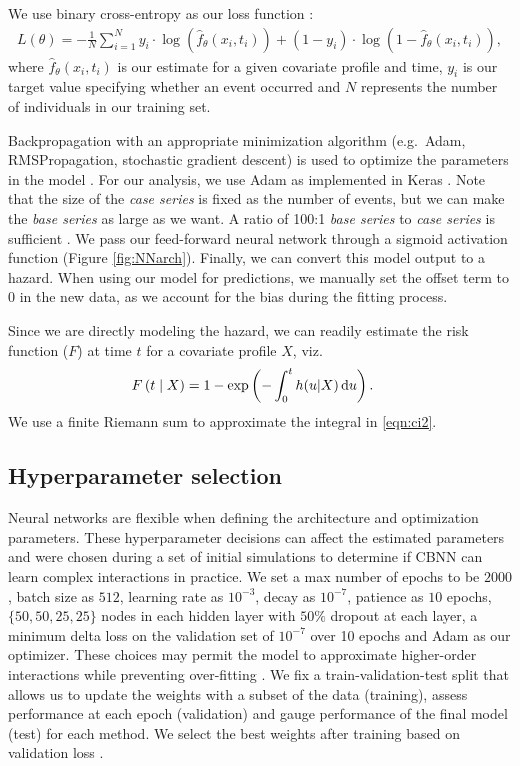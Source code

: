 \documentclass[AMA,STIX1COL,]{WileyNJD-v2}
\begin{document}
We use binary cross-entropy as our loss function \citep{gulli2017}:
\begin{align*}
L(\theta)=-\frac{1}{N} \sum^{N}_{i=1} y_{i} \cdot \log(\hat{f}_{\theta}(x_{i}, t_{i}) ) + (1-y_{i} )\cdot \log(1-\hat{f}_{\theta}(x_{i}, t_{i}) ),
\end{align*} where \(\hat{f}_{\theta}(x_{i}, t_{i})\) is our estimate
for a given covariate profile and time, \(y_{i}\) is our target value
specifying whether an event occurred and \(N\) represents the number of
individuals in our training set.

Backpropagation with an appropriate minimization algorithm (e.g.~Adam,
RMSPropagation, stochastic gradient descent) is used to optimize the
parameters in the model \citep{gulli2017}. For our analysis, we use Adam
as implemented in Keras \citep{gulli2017}. Note that the size of the
\emph{case series} is fixed as the number of events, but we can make the
\emph{base series} as large as we want. A ratio of 100:1 \emph{base
series} to \emph{case series} is sufficient \citep{hanley2009}. We pass
our feed-forward neural network through a sigmoid activation function
(Figure \ref{fig:NNarch}). Finally, we can convert this model output to
a hazard. When using our model for predictions, we manually set the
offset term to 0 in the new data, as we account for the bias during the
fitting process.

Since we are directly modeling the hazard, we can readily estimate the
risk function (\(F\)) at time \(t\) for a covariate profile \(X\),
viz.\begin{align}\label{eqn:ci2}
F\left(t\mid X\right)& = 1 - \exp\left(-\int_{0}^{t}h(u|X) \,\textrm du\right).
\end{align} We use a finite Riemann sum \citep{hughes2020calculus} to
approximate the integral in \eqref{eqn:ci2}.

\hypertarget{hyperparameter-selection}{%
\subsection{Hyperparameter selection}\label{hyperparameter-selection}}

Neural networks are flexible when defining the architecture and
optimization parameters. These hyperparameter decisions can affect the
estimated parameters and were chosen during a set of initial simulations
to determine if CBNN can learn complex interactions in practice. We set
a max number of epochs to be \(2000\), batch size as \(512\), learning
rate as \(10^{-3}\), decay as \(10^{-7}\), patience as \(10\) epochs,
\(\{50,50,25,25\}\) nodes in each hidden layer with \(50\%\) dropout at
each layer, a minimum delta loss on the validation set of \(10^{-7}\)
over 10 epochs and Adam \citep{gulli2017} as our optimizer. These
choices may permit the model to approximate higher-order interactions
while preventing over-fitting \citep{srivastava2014dropout}. We fix a
train-validation-test split that allows us to update the weights with a
subset of the data (training), assess performance at each epoch
(validation) and gauge performance of the final model (test) for each
method. We select the best weights after training based on validation
loss \citep{gulli2017}.
\end{document}

